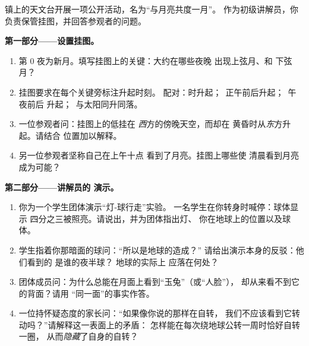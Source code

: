\begin{problem}\label{pb:g7:moon-phases:1}
镇上的天文台开展一项公开活动，名为“与月亮共度一月”。
作为初级讲解员，你负责保管挂图，并回答参观者的问题。

\medskip\noindent\textbf{第一部分——设置挂图。}
\begin{enumerate}
  \item 第 0 夜为新月。填写挂图上的关键：大约在哪些夜晚
        出现上弦月、和
        下弦月？
  \item 挂图要求在每个关键旁标注升起时刻。
        配对：时升起；\ 正午前后升起；\ 午夜前后
        升起；\ 与太阳同升同落。
  \item 一位参观者问：挂图上的低挂在
        \emph{西}方的傍晚天空，而却在
        黄昏时从\emph{东}方升起。请结合
        位置加以解释。
  \item 另一位参观者坚称自己在上午十点
        看到了月亮。挂图上哪些使
        清晨看到月亮成为可能？
\end{enumerate}

\medskip\noindent\textbf{第二部分——讲解员的
演示。}
\begin{enumerate}[resume]
  \item 你为一个学生团体演示“灯-球行走”实验。
        一名学生在你转身时喊停：球体显示
        四分之三被照亮。请说出，并为团体指出灯、
        你在地球上的位置以及球体。
  \item 学生指着你那暗面的球问：“所以是地球的造成？”
        请给出演示本身的反驳：他们看到的
        是谁的夜半球？
        地球的实际上
        应落在何处？
  \item 团体成员问：为什么总能在月面上看到“玉兔”（或“人脸”），
        却从来看不到它的背面？请用
        “同一面”的事实作答。
  \item 一位持怀疑态度的家长问：“如果像你说的那样在自转，
        我们不应该看到它转动吗？”请解释这一表面上的矛盾：
        怎样能在每次绕地球公转一周时恰好自转一圈，
        从而\emph{隐藏}了自身的自转？
\end{enumerate}


\end{problem}
